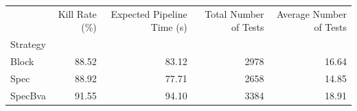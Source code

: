 \begin{tabular}{lrrrr}
\toprule
 & Kill Rate (\%) & Expected Pipeline Time (s) & Total Number of Tests & Average Number of Tests \\
Strategy &  &  &  &  \\
\midrule
Block & 88.52 & 83.12 & 2978 & 16.64 \\
Spec & 88.92 & 77.71 & 2658 & 14.85 \\
SpecBva & 91.55 & 94.10 & 3384 & 18.91 \\
\bottomrule
\end{tabular}
